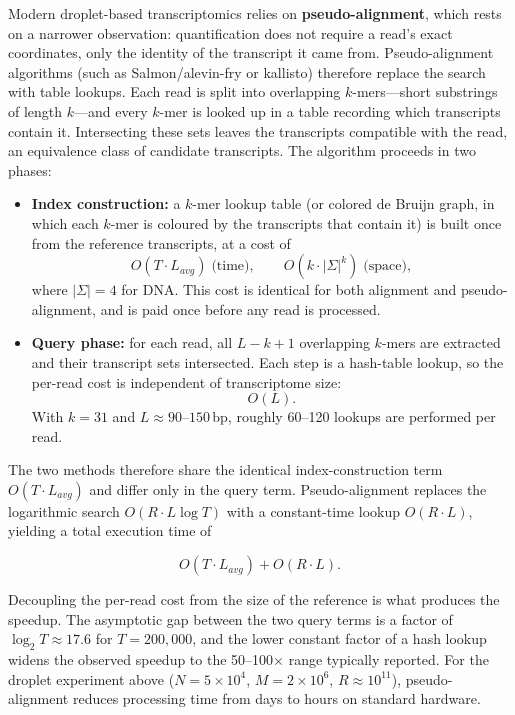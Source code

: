 Modern droplet-based transcriptomics relies on \textbf{pseudo-alignment}, which rests on a narrower observation: quantification does not require a read's exact coordinates, only the identity of the transcript it came from. Pseudo-alignment algorithms (such as Salmon/alevin-fry or kallisto) therefore replace the search with table lookups. Each read is split into overlapping $k$-mers---short substrings of length $k$---and every $k$-mer is looked up in a table recording which transcripts contain it. Intersecting these sets leaves the transcripts compatible with the read, an equivalence class of candidate transcripts\cite{he2022alevin}. The algorithm proceeds in two phases:

\begin{itemize}
    \item \textbf{Index construction:} a $k$-mer lookup table (or colored de Bruijn graph, in which each $k$-mer is coloured by the transcripts that contain it) is built once from the reference transcripts, at a cost of
    $$O(T \cdot L_{avg}) \;\text{(time)}, \qquad O(k \cdot |\Sigma|^k) \;\text{(space)},$$
    where $|\Sigma|=4$ for DNA. This cost is identical for both alignment and pseudo-alignment, and is paid once before any read is processed.
    
    \item \textbf{Query phase:} for each read, all $L-k+1$ overlapping $k$-mers are extracted and their transcript sets intersected. Each step is a hash-table lookup, so the per-read cost is independent of transcriptome size:
    $$O(L).$$ With $k=31$ and $L \approx 90$--$150$\,bp, roughly 60--120 lookups are performed per read.
\end{itemize}

The two methods therefore share the identical index-construction term $O(T \cdot L_{avg})$ and differ only in the query term. Pseudo-alignment replaces the logarithmic search $O(R \cdot L \log T)$ with a constant-time lookup $O(R \cdot L)$, yielding a total execution time of

$$O(T \cdot L_{avg}) + O(R \cdot L).$$

Decoupling the per-read cost from the size of the reference is what produces the speedup. The asymptotic gap between the two query terms is a factor of $\log_2 T \approx 17.6$ for $T = 200{,}000$, and the lower constant factor of a hash lookup widens the observed speedup to the 50--100× range typically reported. For the droplet experiment above ($N = 5 \times 10^4$, $M = 2 \times 10^6$, $R \approx 10^{11}$), pseudo-alignment reduces processing time from days to hours on standard hardware.



